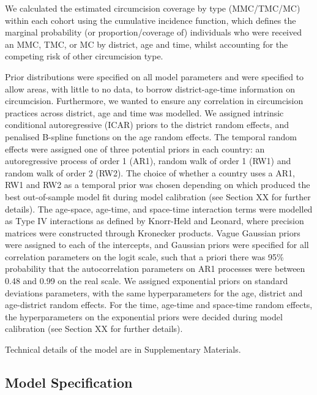 \documentclass{article}
\begin{document}
We calculated the estimated circumcision coverage by type (MMC/TMC/MC) within each cohort using the cumulative incidence function, which defines the marginal probability (or proportion/coverage of) individuals who were received an MMC, TMC, or MC by district, age and time, whilst accounting for the competing risk of other circumcision type.

Prior distributions were specified on all model parameters and were specified to allow areas, with little to no data, to borrow district-age-time information on circumcision. Furthermore, we wanted to ensure any correlation in circumcision practices across district, age and time was modelled. We assigned intrinsic conditional autoregressive (ICAR) priors to the district random effects, and penalised B-spline functions on the age random effects. The temporal random effects were assigned one of three potential priors in each country: an autoregressive process of order 1 (AR1), random walk of order 1 (RW1) and random walk of order 2 (RW2). The choice of whether a country uses a AR1, RW1 and RW2 as a temporal prior was chosen depending on which produced the best out-of-sample model fit during model calibration (see Section XX for further details). The age-space, age-time, and space-time interaction terms were modelled as Type IV interactions as defined by Knorr-Held and Leonard, where precision matrices were constructed through Kronecker products. Vague Gaussian priors were assigned to each of the intercepts, and Gaussian priors were specified for all correlation parameters on the logit scale, such that a priori there was 95\% probability that the autocorrelation parameters on AR1 processes were between 0.48 and 0.99 on the real scale. We assigned exponential priors on standard deviations parameters, with the same hyperparameters for the age, district and age-district random effects. For the time, age-time and space-time random effects, the hyperparameters on the exponential priors were decided during model calibration (see Section XX for further details). 

Technical details of the model are in Supplementary Materials.


\subsection{Model Specification}
\label{sec:orgaf7fa2a}
\end{document}
